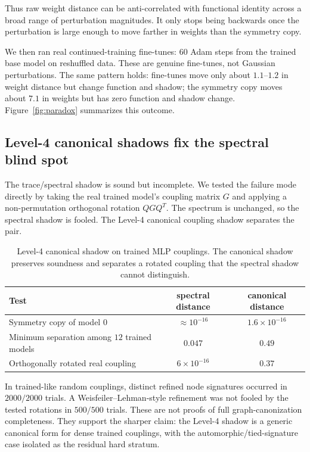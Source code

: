 \documentclass[11pt]{article}
\begin{document}
Thus raw weight distance can be anti-correlated with functional identity across a broad range of perturbation magnitudes. It only stops being backwards once the perturbation is large enough to move farther in weights than the symmetry copy.

We then ran real continued-training fine-tunes: $60$ Adam steps from the trained base model on reshuffled data. These are genuine fine-tunes, not Gaussian perturbations. The same pattern holds: fine-tunes move only about $1.1$--$1.2$ in weight distance but change function and shadow; the symmetry copy moves about $7.1$ in weights but has zero function and shadow change. Figure~\ref{fig:paradox} summarizes this outcome.

\subsection{Level-4 canonical shadows fix the spectral blind spot}

The trace/spectral shadow is sound but incomplete. We tested the failure mode directly by taking the real trained model's coupling matrix $G$ and applying a non-permutation orthogonal rotation $QGQ^T$. The spectrum is unchanged, so the spectral shadow is fooled. The Level-4 canonical coupling shadow separates the pair.

\begin{table}[h]
\centering
\caption{Level-4 canonical shadow on trained MLP couplings. The canonical shadow preserves soundness and separates a rotated coupling that the spectral shadow cannot distinguish.}
\label{tab:level4}
\begin{tabular}{lcc}
\toprule
Test & spectral distance & canonical distance\\
\midrule
Symmetry copy of model $0$ & $\approx 10^{-16}$ & $1.6\times 10^{-16}$\\
Minimum separation among $12$ trained models & $0.047$ & $0.49$\\
Orthogonally rotated real coupling & $6\times 10^{-16}$ & $0.37$\\
\bottomrule
\end{tabular}
\end{table}

In trained-like random couplings, distinct refined node signatures occurred in $2000/2000$ trials. A Weisfeiler--Lehman-style refinement was not fooled by the tested rotations in $500/500$ trials. These are not proofs of full graph-canonization completeness. They support the sharper claim: the Level-4 shadow is a generic canonical form for dense trained couplings, with the automorphic/tied-signature case isolated as the residual hard stratum.
\end{document}
